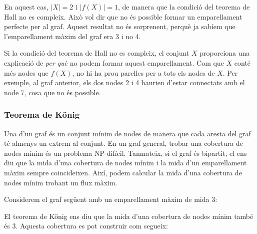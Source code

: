 En aquest cas, $|X|=2$ i $|f(X)|=1$, de manera que la condició del
teorema de Hall no es compleix. Això vol dir que no és possible formar
un emparellament perfecte per al graf. Aquest resultat no és
sorprenent, perquè ja sabíem que l'emparellament màxim del graf era 3
i no 4.

Si la condició del teorema de Hall no es compleix, el conjunt $X$
proporciona una explicació de \emph{per què} no podem formar aquest
emparellament. Com que $X$ conté més nodes que $f(X)$, no hi ha prou
parelles per a tots els nodes de $X$. Per exemple, al graf anterior,
els dos nodes 2 i 4 haurien d'estar connectats amb el node 7, cosa que
no és possible.

\subsubsection{Teorema de Kőnig}

  

Una  d'un graf és un conjunt mínim de
nodes de manera que cada aresta del graf té almenys un extrem al
conjunt. En un graf general, trobar una cobertura de nodes mínim és
un problema NP-difícil. Tanmateix, si el graf és bipartit, el
 ens diu que la mida d'una cobertura de nodes
mínim i la mida d'un emparellament màxim sempre coincideixen. Així,
podem calcular la mida d'una cobertura de nodes mínim trobant un flux
màxim.

Considerem el graf següent amb un emparellament màxim de mida 3:
\begin{center}
\end{center}
El teorema de Kőnig ens diu que la mida d'una cobertura de nodes
mínim també és 3. Aquesta cobertura es pot construir com segueix:


